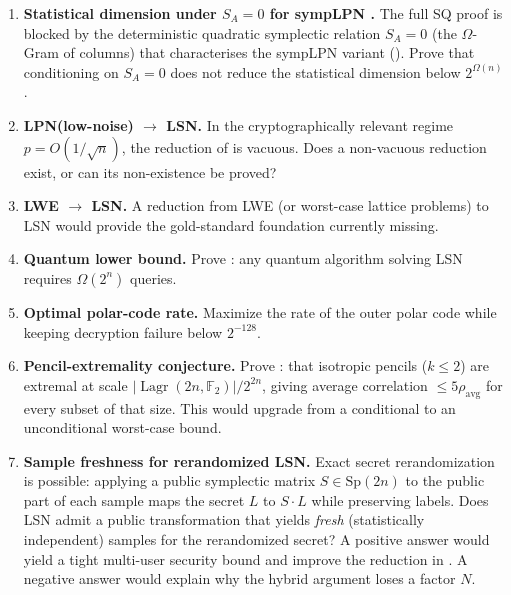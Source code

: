 \documentclass[11pt,a4paper]{article}
\theoremstyle{plain}
\theoremstyle{definition}
\newcommand{\F}{\mathbb{F}}
\DeclareMathOperator{\Lagr}{Lagr}
\begin{document}
\begin{enumerate}
\item \textbf{Statistical dimension under $S_A=0$ for sympLPN \cite{LPQR26}.} The full SQ proof is blocked by the deterministic quadratic symplectic relation $S_A=0$ (the $\Omega$-Gram of columns) that characterises the sympLPN variant (). Prove that conditioning on $S_A=0$ does not reduce the statistical dimension below $2^{\Omega(n)}$.

\item \textbf{LPN(low-noise) $\to$ LSN.} In the cryptographically relevant regime $p=O(1/\sqrt{n})$, the reduction of \cite{KLP+25} is vacuous. Does a non-vacuous reduction exist, or can its non-existence be proved?

\item \textbf{LWE $\to$ LSN.} A reduction from LWE (or worst-case lattice problems) to LSN would provide the gold-standard foundation currently missing.

\item \textbf{Quantum lower bound.} Prove : any quantum algorithm solving LSN requires $\Omega(2^n)$ queries.

\item \textbf{Optimal polar-code rate.} Maximize the rate of the outer polar code while keeping decryption failure below $2^{-128}$.

\item \textbf{Pencil-extremality conjecture.} \label{open:sda} Prove : that isotropic pencils ($k \leq 2$) are extremal at scale $|\Lagr(2n,\F_2)|/2^{2n}$, giving average correlation $\leq 5\rho_{\mathrm{avg}}$ for every subset of that size. This would upgrade  from a conditional to an unconditional worst-case bound.

\item \textbf{Sample freshness for rerandomized LSN.} Exact secret rerandomization is possible: applying a public symplectic matrix $S \in \mathrm{Sp}(2n)$ to the public part of each sample maps the secret $L$ to $S\cdot L$ while preserving labels. Does LSN admit a public transformation that yields \emph{fresh} (statistically independent) samples for the rerandomized secret? A positive answer would yield a tight multi-user security bound and improve the reduction in . A negative answer would explain why the hybrid argument loses a factor $N$.


\end{enumerate}
\end{document}
